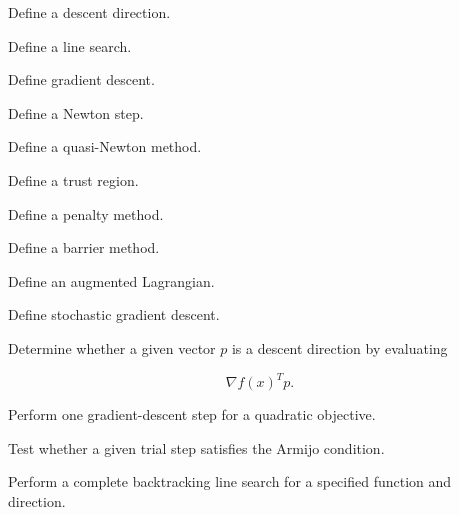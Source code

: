 \begin{exercise}[1]
Define a descent direction.
\end{exercise}

\begin{exercise}[1]
Define a line search.
\end{exercise}

\begin{exercise}[1]
Define gradient descent.
\end{exercise}

\begin{exercise}[1]
Define a Newton step.
\end{exercise}

\begin{exercise}[1]
Define a quasi-Newton method.
\end{exercise}

\begin{exercise}[1]
Define a trust region.
\end{exercise}

\begin{exercise}[1]
Define a penalty method.
\end{exercise}

\begin{exercise}[1]
Define a barrier method.
\end{exercise}

\begin{exercise}[1]
Define an augmented Lagrangian.
\end{exercise}

\begin{exercise}[1]
Define stochastic gradient descent.
\end{exercise}

\begin{exercise}[2]
Determine whether a given vector \(p\) is a descent direction by evaluating

\[
\nabla f(x)^Tp.
\]
\end{exercise}

\begin{exercise}[2]
Perform one gradient-descent step for a quadratic objective.
\end{exercise}

\begin{exercise}[2]
Test whether a given trial step satisfies the Armijo condition.
\end{exercise}

\begin{exercise}[3]
Perform a complete backtracking line search for a specified function and
direction.
\end{exercise}

